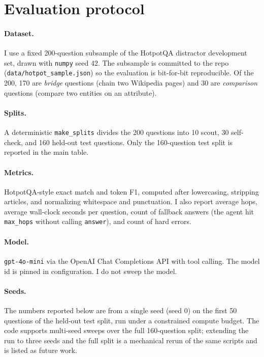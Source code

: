 \documentclass[11pt,a4paper]{article}
\begin{document}
\section{Evaluation protocol}

\paragraph{Dataset.} I use a fixed 200-question subsample of the HotpotQA
distractor development set, drawn with \texttt{numpy} seed 42. The
subsample is committed to the repo (\texttt{data/hotpot\_sample.json}) so
the evaluation is bit-for-bit reproducible. Of the 200, 170 are
\emph{bridge} questions (chain two Wikipedia pages) and 30 are
\emph{comparison} questions (compare two entities on an attribute).

\paragraph{Splits.} A deterministic \texttt{make\_splits} divides the 200
questions into 10 scout, 30 self-check, and 160 held-out test questions.
Only the 160-question test split is reported in the main table.

\paragraph{Metrics.} HotpotQA-style exact match and token F1, computed
after lowercasing, stripping articles, and normalizing whitespace and
punctuation. I also report average hops, average wall-clock seconds per
question, count of fallback answers (the agent hit \texttt{max\_hops}
without calling \texttt{answer}), and count of hard errors.

\paragraph{Model.} \texttt{gpt-4o-mini} via the OpenAI Chat Completions
API with tool calling. The model id is pinned in configuration. I do not
sweep the model.

\paragraph{Seeds.} The numbers reported below are from a single seed
(seed 0) on the first 50 questions of the held-out test split, run
under a constrained compute budget. The code supports multi-seed
sweeps over the full 160-question split; extending the run to three
seeds and the full split is a mechanical rerun of the same scripts
and is listed as future work.
\end{document}
